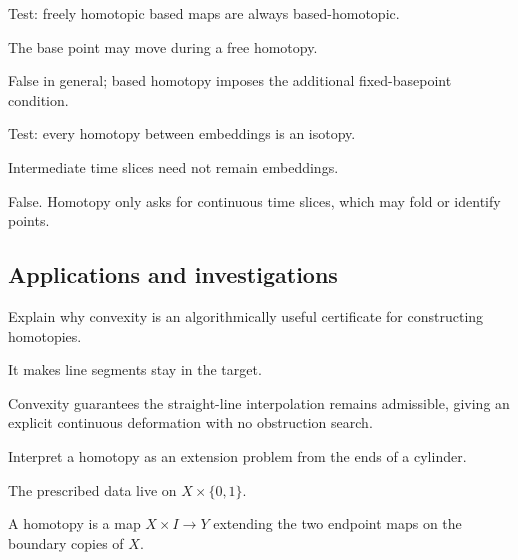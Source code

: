 \begin{exercise}\label{exr:viii01-ped-11}
Test: freely homotopic based maps are always based-homotopic.
\end{exercise}
\begin{hint}
The base point may move during a free homotopy.
\end{hint}
\begin{solution}
False in general; based homotopy imposes the additional fixed-basepoint condition.
\end{solution}

\begin{exercise}\label{exr:viii01-ped-12}
Test: every homotopy between embeddings is an isotopy.
\end{exercise}
\begin{hint}
Intermediate time slices need not remain embeddings.
\end{hint}
\begin{solution}
False.  Homotopy only asks for continuous time slices, which may fold or identify points.
\end{solution}

\subsection*{Applications and investigations}

\begin{exercise}\label{exr:viii01-ped-13}
Explain why convexity is an algorithmically useful certificate for constructing homotopies.
\end{exercise}
\begin{hint}
It makes line segments stay in the target.
\end{hint}
\begin{solution}
Convexity guarantees the straight-line interpolation remains admissible, giving an explicit continuous deformation with no obstruction search.
\end{solution}

\begin{exercise}\label{exr:viii01-ped-14}
Interpret a homotopy as an extension problem from the ends of a cylinder.
\end{exercise}
\begin{hint}
The prescribed data live on $X\times\{0,1\}$.
\end{hint}
\begin{solution}
A homotopy is a map $X\times I\to Y$ extending the two endpoint maps on the boundary copies of $X$.
\end{solution}

